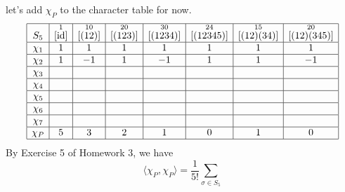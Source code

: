 \begin{exmp}{}
    let's add $\chi_P$ to the character table for now. 
    \begin{align*}
        \begin{array}{|c|c|c|c|c|c|c|c|}
            \hline
            S_5    & \overset{1}{[\operatorname{id}]} & \overset{10}{[(12)]} & \overset{20}{[(123)]} & \overset{30}{[(1234)]} & \overset{24}{[(12345)]} & \overset{15}{[(12)(34)]} & \overset{20}{[(12)(345)]} \\ \hline
            \chi_1 & 1                  & 1                    & 1                     & 1                      & 1                       & 1                        & 1                         \\ \hline
            \chi_2 & 1                  & -1                   & 1                     & -1                     & 1                       & 1                        & -1                        \\ \hline
            \chi_3 &                    &                      &                       &                        &                         &                          &                           \\ \hline
            \chi_4 &                    &                      &                       &                        &                         &                          &                           \\ \hline
            \chi_5 &                    &                      &                       &                        &                         &                          &                           \\ \hline
            \chi_6 &                    &                      &                       &                        &                         &                          &                           \\ \hline
            \chi_7 &                    &                      &                       &                        &                         &                          &                           \\ \hline
            \chi_P & 5                  & 3                    & 2                     & 1                      & 0                       & 1                        & 0                         \\ \hline 
        \end{array} 
    \end{align*}
    By Exercise 5 of Homework 3, we have 
    \[ \langle \chi_P, \chi_P \rangle = \frac1{5!} \sum_{\sigma \in S_5} 
\]
\end{exmp}
